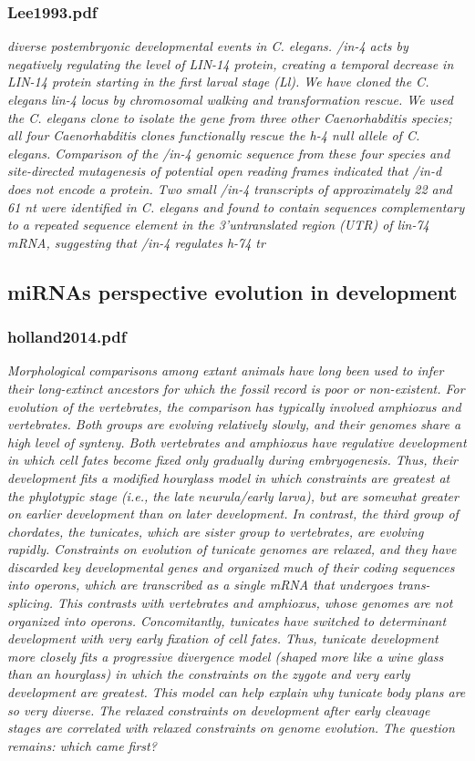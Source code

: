\documentclass[graybox]{svmult}
\begin{document}
\subsubsection{Lee1993.pdf}

\cite{Lee1993}
\textit{diverse postembryonic developmental events in C.
elegans. /in-4 acts by negatively regulating the level of
LIN-14 protein, creating a temporal decrease in LIN-14
protein starting in the first larval stage (Ll). We have
cloned the C. elegans lin-4 locus by chromosomal
walking and transformation rescue. We used the C.
elegans clone to isolate the gene from three other
Caenorhabditis species; all four Caenorhabditis clones
functionally rescue the h-4 null allele of C. elegans.
Comparison of the /in-4 genomic sequence from these
four species and site-directed mutagenesis of potential
open reading frames indicated that /in-d does not
encode a protein. Two small /in-4 transcripts of approximately
22 and 61 nt were identified in C. elegans and
found to contain sequences complementary to a repeated
sequence element in the 3'untranslated region
(UTR) of lin-74 mRNA, suggesting that /in-4 regulates
h-74 tr}


\subsection{miRNAs perspective evolution in development}
\subsubsection{holland2014.pdf}
\cite{Holland2015} \textit{
Morphological comparisons among extant animals have long been used to infer 
their long-extinct ancestors for which the fossil record is poor or 
non-existent. For evolution of the vertebrates, the comparison has typically 
involved amphioxus and vertebrates. Both groups are evolving relatively slowly, 
and their genomes share a high level of synteny. Both vertebrates and amphioxus 
have regulative development in which cell fates become fixed only gradually 
during embryogenesis. Thus, their development fits a modified hourglass model in 
which constraints are greatest at the phylotypic stage (i.e., the late 
neurula/early larva), but are somewhat greater on earlier development than on 
later development. In contrast, the third group of chordates, the tunicates, 
which are sister group to vertebrates, are evolving rapidly. Constraints on 
evolution of tunicate genomes are relaxed, and they have discarded key 
developmental genes and organized much of their coding sequences into operons, 
which are transcribed as a single mRNA that undergoes trans-splicing. This 
contrasts with vertebrates and amphioxus, whose genomes are not organized into 
operons. Concomitantly, tunicates have switched to determinant development with 
very early fixation of cell fates. Thus, tunicate development more closely fits 
a progressive divergence model (shaped more like a wine glass than an hourglass) 
in which the constraints on the zygote and very early development are greatest. 
This model can help explain why tunicate body plans are so very diverse. The 
relaxed constraints on development after early cleavage stages are correlated 
with relaxed constraints on genome evolution. The question remains: which came 
first?}
\end{document}
